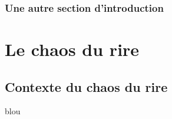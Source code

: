 \documentclass[12pt,space=onehalf,version=final]{yathesis}
\begin{document}
\section{Une autre section d'introduction}
\lipsum[37]
%
%
\part{Le chaos du rire}
%
\chapter{Contexte du chaos du rire}
blou

%
%
%

\end{document}
